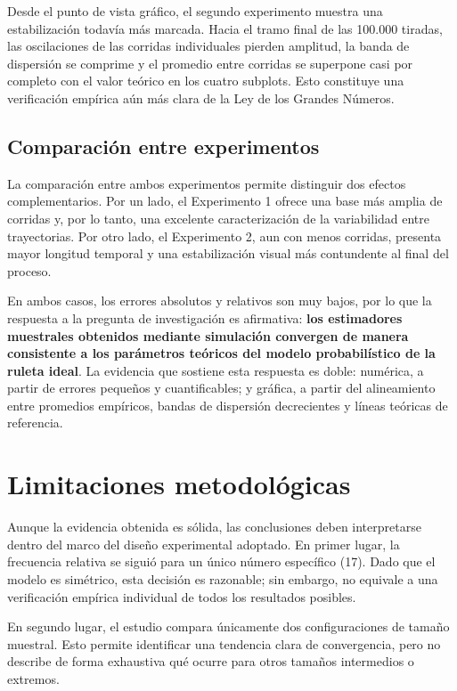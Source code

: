 \documentclass{article}
\begin{document}
Desde el punto de vista gráfico, el segundo experimento muestra una estabilización todavía más marcada. Hacia el tramo final de las 100.000 tiradas, las oscilaciones de las corridas individuales pierden amplitud, la banda de dispersión se comprime y el promedio entre corridas se superpone casi por completo con el valor teórico en los cuatro subplots. Esto constituye una verificación empírica aún más clara de la Ley de los Grandes Números.

\subsection{Comparación entre experimentos}
La comparación entre ambos experimentos permite distinguir dos efectos complementarios. Por un lado, el Experimento 1 ofrece una base más amplia de corridas y, por lo tanto, una excelente caracterización de la variabilidad entre trayectorias. Por otro lado, el Experimento 2, aun con menos corridas, presenta mayor longitud temporal y una estabilización visual más contundente al final del proceso.

En ambos casos, los errores absolutos y relativos son muy bajos, por lo que la respuesta a la pregunta de investigación es afirmativa: \textbf{los estimadores muestrales obtenidos mediante simulación convergen de manera consistente a los parámetros teóricos del modelo probabilístico de la ruleta ideal}. La evidencia que sostiene esta respuesta es doble: numérica, a partir de errores pequeños y cuantificables; y gráfica, a partir del alineamiento entre promedios empíricos, bandas de dispersión decrecientes y líneas teóricas de referencia.

\section{Limitaciones metodológicas}
Aunque la evidencia obtenida es sólida, las conclusiones deben interpretarse dentro del marco del diseño experimental adoptado. En primer lugar, la frecuencia relativa se siguió para un único número específico (17). Dado que el modelo es simétrico, esta decisión es razonable; sin embargo, no equivale a una verificación empírica individual de todos los resultados posibles.

En segundo lugar, el estudio compara únicamente dos configuraciones de tamaño muestral. Esto permite identificar una tendencia clara de convergencia, pero no describe de forma exhaustiva qué ocurre para otros tamaños intermedios o extremos.
\end{document}
